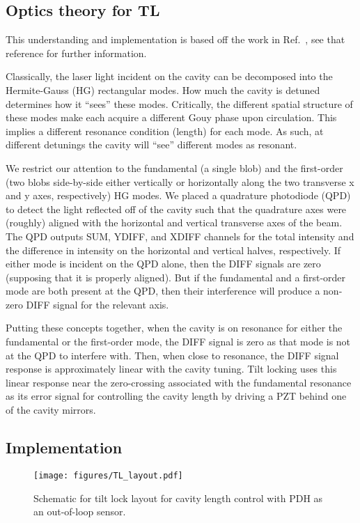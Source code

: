 \documentclass[aps,pra,superscriptaddress,reprint,nofootinbib]{revtex4-1}
\begin{document}
\subsection{Optics theory for TL}

This understanding and implementation is based off the work in Ref.~\cite{TL:1999}, see that reference for further information.


Classically, the laser light incident on the cavity can be decomposed into the Hermite-Gauss (HG) rectangular modes. How much the cavity is detuned determines how it ``sees'' these modes. Critically, the different spatial structure of these modes make each acquire a different Gouy phase upon circulation. This implies a different resonance condition (length) for each mode. As such, at different detunings the cavity will ``see'' different modes as resonant.


We restrict our attention to the fundamental (a single blob) and the first-order (two blobs side-by-side either vertically or horizontally along the two transverse x and y axes, respectively) HG modes. We placed a quadrature photodiode (QPD) to detect the light reflected off of the cavity such that the quadrature axes were (roughly) aligned with the horizontal and vertical transverse axes of the beam. The QPD outputs SUM, YDIFF, and XDIFF channels for the total intensity and the difference in intensity on the horizontal and vertical halves, respectively. If either mode is incident on the QPD alone, then the DIFF signals are zero (supposing that it is properly aligned). But if the fundamental and a first-order mode are both present at the QPD, then their interference will produce a non-zero DIFF signal for the relevant axis.


Putting these concepts together, when the cavity is on resonance for either the fundamental or the first-order mode, the DIFF signal is zero as that mode is not at the QPD to interfere with. %
Then, when close to resonance, the DIFF signal response is approximately linear with the cavity tuning. Tilt locking uses this linear response near the zero-crossing associated with the fundamental resonance as its error signal for controlling the cavity length by driving a PZT behind one of the cavity mirrors.


\subsection{Implementation}

\begin{figure*}
	\texttt{[image: figures/TL\_layout.pdf]}
	\caption{Schematic for tilt lock layout for cavity length control with PDH as an out-of-loop sensor.}
	\label{fig:TL_layout}
\end{figure*}
\end{document}
